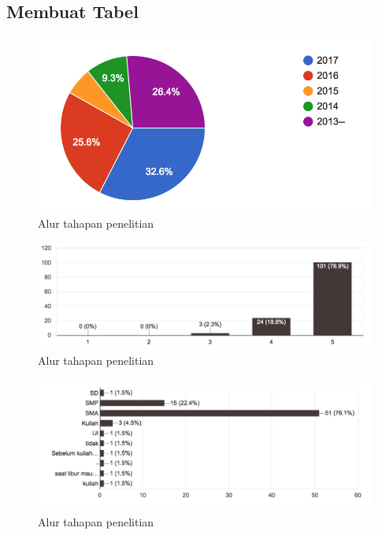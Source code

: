 \chapter{\babEmpat}
\section{Membuat Tabel}

\begin{figure}
	\includegraphics{pics/angkatan}
	\caption{Alur tahapan penelitian}
	\centering
\end{figure}
\begin{figure}
	\includegraphics[width=\linewidth]{pics/contoh-langsung}
	\caption{Alur tahapan penelitian}
	\centering
\end{figure}
\begin{figure}
	\includegraphics[width=\linewidth]{pics/kapan-pernah-belajarnya}
	\caption{Alur tahapan penelitian}
	\centering
\end{figure}
